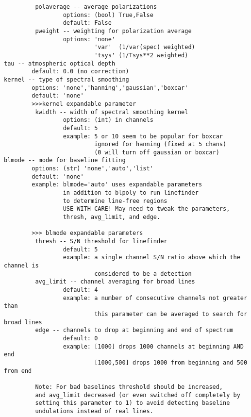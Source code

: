 \begin{verbatim}
         polaverage -- average polarizations
                 options: (bool) True,False
                 default: False
         pweight -- weighting for polarization average
                 options: 'none'
                          'var'  (1/var(spec) weighted)
                          'tsys' (1/Tsys**2 weighted)
tau -- atmospheric optical depth
        default: 0.0 (no correction)
kernel -- type of spectral smoothing
        options: 'none','hanning','gaussian','boxcar'
        default: 'none'
        >>>kernel expandable parameter
         kwidth -- width of spectral smoothing kernel
                 options: (int) in channels
                 default: 5
                 example: 5 or 10 seem to be popular for boxcar
                          ignored for hanning (fixed at 5 chans)
                          (0 will turn off gaussian or boxcar)
blmode -- mode for baseline fitting
        options: (str) 'none','auto','list'
        default: 'none'
        example: blmode='auto' uses expandable parameters
                 in addition to blpoly to run linefinder
                 to determine line-free regions
                 USE WITH CARE! May need to tweak the parameters,
                 thresh, avg_limit, and edge.

        >>> blmode expandable parameters
         thresh -- S/N threshold for linefinder
                 default: 5
                 example: a single channel S/N ratio above which the channel is
                          considered to be a detection
         avg_limit -- channel averaging for broad lines
                 default: 4
                 example: a number of consecutive channels not greater than
                          this parameter can be averaged to search for broad lines
         edge -- channels to drop at beginning and end of spectrum
                 default: 0
                 example: [1000] drops 1000 channels at beginning AND end
                          [1000,500] drops 1000 from beginning and 500 from end

         Note: For bad baselines threshold should be increased,
         and avg_limit decreased (or even switched off completely by
         setting this parameter to 1) to avoid detecting baseline
         undulations instead of real lines.


\end{verbatim}
